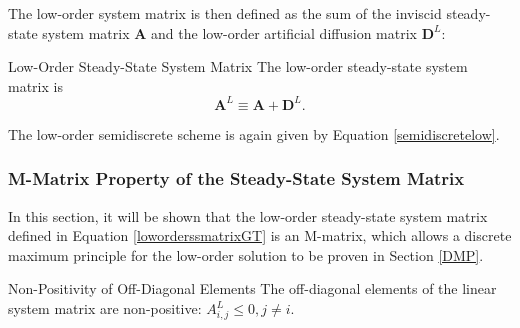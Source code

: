 The low-order system matrix is then defined as the sum of the inviscid
steady-state system matrix $\mathbf{A}$ and the low-order artificial diffusion
matrix $\mathbf{D}^L$:
\begin{definition}{Low-Order Steady-State System Matrix}
   The low-order steady-state system matrix is
   \begin{equation}\label{loworderssmatrixGT}
      \mathbf{A}^L \equiv \mathbf{A} + \mathbf{D}^L.
   \end{equation}
\end{definition}
The low-order semidiscrete scheme is again given by Equation \eqref{semidiscretelow}.
\subsubsection{M-Matrix Property of the Steady-State System Matrix}
In this section, it will be shown that the low-order steady-state
system matrix defined in Equation \eqref{loworderssmatrixGT} is an M-matrix, which
allows a discrete maximum principle for the low-order solution to be proven in
Section \ref{DMP}.
\begin{lemma}[label={offdiagonalnegative_gt}]{Non-Positivity of Off-Diagonal Elements}
   The off-diagonal elements of the linear system matrix are non-positive:
   $A^L_{i,j}\le 0, j\ne i$.
\end{lemma}

